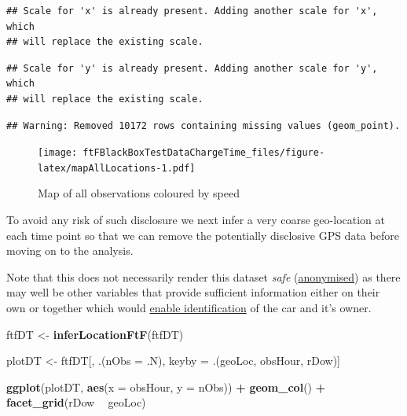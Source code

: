 \documentclass[]{article}
\newenvironment{Shaded}{\begin{snugshade}}{\end{snugshade}}
\newcommand{\KeywordTok}[1]{\textcolor[rgb]{0.13,0.29,0.53}{\textbf{#1}}}
\newcommand{\DataTypeTok}[1]{\textcolor[rgb]{0.13,0.29,0.53}{#1}}
\newcommand{\StringTok}[1]{\textcolor[rgb]{0.31,0.60,0.02}{#1}}
\newcommand{\OperatorTok}[1]{\textcolor[rgb]{0.81,0.36,0.00}{\textbf{#1}}}
\newcommand{\NormalTok}[1]{#1}
\begin{document}
\begin{verbatim}
## Scale for 'x' is already present. Adding another scale for 'x', which
## will replace the existing scale.
\end{verbatim}

\begin{verbatim}
## Scale for 'y' is already present. Adding another scale for 'y', which
## will replace the existing scale.
\end{verbatim}

\begin{verbatim}
## Warning: Removed 10172 rows containing missing values (geom_point).
\end{verbatim}

\begin{figure}
\centering
\texttt{[image: ftFBlackBoxTestDataChargeTime\_files/figure-latex/mapAllLocations-1.pdf]}
\caption{\label{fig:mapAllLocations}Map of all observations coloured by
speed}
\end{figure}

To avoid any risk of such disclosure we next infer a very coarse
geo-location at each time point so that we can remove the potentially
disclosive GPS data before moving on to the analysis.

Note that this does not necessarily render this dataset \emph{safe}
(\href{https://www.ukdataservice.ac.uk/manage-data/legal-ethical/anonymisation}{anonymised})
as there may well be other variables that provide sufficient information
either on their own or together which would
\href{https://www.ukdataservice.ac.uk/manage-data/legal-ethical/anonymisation}{enable
identification} of the car and it's owner.

\begin{Shaded}
\begin{Highlighting}[]
\NormalTok{ftfDT <-}\StringTok{ }\KeywordTok{inferLocationFtF}\NormalTok{(ftfDT)}

\NormalTok{plotDT <-}\StringTok{ }\NormalTok{ftfDT[, .(}\DataTypeTok{nObs =}\NormalTok{ .N), }
\NormalTok{                keyby =}\StringTok{ }\NormalTok{.(geoLoc, obsHour, rDow)]}

\KeywordTok{ggplot}\NormalTok{(plotDT, }\KeywordTok{aes}\NormalTok{(}\DataTypeTok{x =}\NormalTok{ obsHour, }\DataTypeTok{y =}\NormalTok{ nObs)) }\OperatorTok{+}\StringTok{ }
\StringTok{  }\KeywordTok{geom_col}\NormalTok{() }\OperatorTok{+}\StringTok{ }
\StringTok{  }\KeywordTok{facet_grid}\NormalTok{(rDow }\OperatorTok{~}\StringTok{ }\NormalTok{geoLoc)}
\end{Highlighting}
\end{Shaded}
\end{document}
